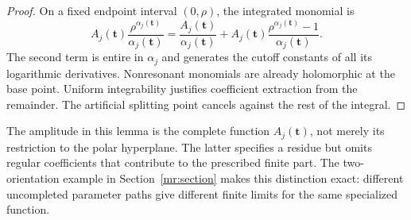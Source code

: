 \begin{proof}
On a fixed endpoint interval $(0,\rho)$, the integrated monomial is
\[
 A_j(\mathbf t)\frac{\rho^{\alpha_j(\mathbf t)}}
                            {\alpha_j(\mathbf t)}
 =\frac{A_j(\mathbf t)}{\alpha_j(\mathbf t)}
  +A_j(\mathbf t)
       \frac{\rho^{\alpha_j(\mathbf t)}-1}{\alpha_j(\mathbf t)}.
\]
The second term is entire in $\alpha_j$ and generates the cutoff
constants of all its logarithmic derivatives. Nonresonant monomials are
already holomorphic at the base point. Uniform integrability justifies
coefficient extraction from the remainder. The artificial splitting
point cancels against the rest of the integral.
\end{proof}

The amplitude in this lemma is the complete function
$A_j(\mathbf t)$, not merely its restriction to the polar hyperplane.
The latter specifies a residue but omits regular coefficients that
contribute to the prescribed finite part. The two-orientation example
in Section~\ref{mr:section} makes this distinction exact: different
uncompleted parameter paths give different finite limits for the same
specialized function.
